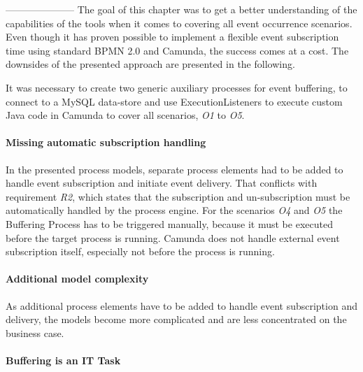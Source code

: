 ---------------------
The goal of this chapter was to get a better understanding of the capabilities of the tools when it comes to covering all event occurrence scenarios. 
Even though it has proven possible to implement a flexible event subscription time using standard BPMN 2.0 and Camunda, the success comes at a cost.
The downsides of the presented approach are presented in the following.

It was necessary to create two generic auxiliary processes for event buffering, to connect to a MySQL data-store and use ExecutionListeners to execute custom Java code in Camunda to cover all scenarios, \textit{O1} to \textit{O5}.



\paragraph{Missing automatic subscription handling\newline}

In the presented process models, separate process elements had to be added to handle event subscription and initiate event delivery. 
That conflicts with requirement \textit{R2}, which states that the subscription and un-subscription must be automatically handled by the process engine.
For the scenarios \textit{O4} and \textit{O5} the Buffering Process has to be triggered manually, because it must be executed before the target process is running. Camunda does not handle external event subscription itself, especially not before the process is running.

\paragraph{Additional model complexity\newline}

As additional process elements have to be added to handle event subscription and delivery, the models become more complicated and are less concentrated on the business case.

\paragraph{Buffering is an IT Task\newline}

